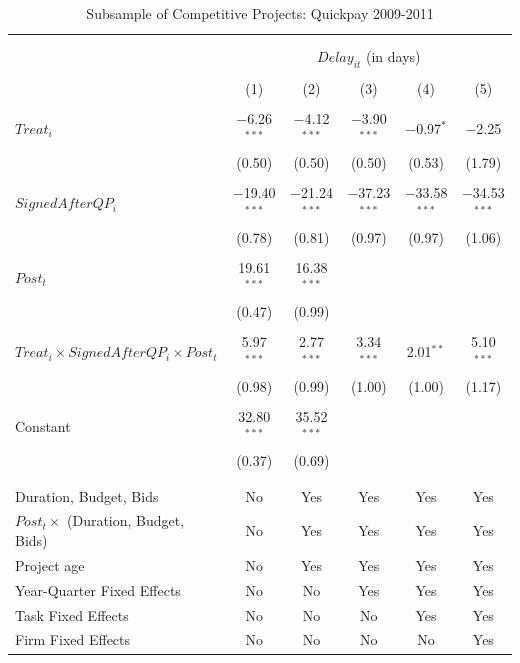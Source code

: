 \documentclass[
]{article}
\begin{document}
\begin{table}[H] \centering 
  \caption{Subsample of Competitive Projects: Quickpay 2009-2011} 
  \label{} 
\small 
\begin{tabular}{@{\extracolsep{-2pt}}lccccc} 
\\[-1.8ex]\hline 
\hline \\[-1.8ex] 
\\[-1.8ex] & \multicolumn{5}{c}{$Delay_{it}$ (in days)} \\ 
\\[-1.8ex] & (1) & (2) & (3) & (4) & (5)\\ 
\hline \\[-1.8ex] 
 $Treat_i$ & $-$6.26$^{***}$ & $-$4.12$^{***}$ & $-$3.90$^{***}$ & $-$0.97$^{*}$ & $-$2.25 \\ 
  & (0.50) & (0.50) & (0.50) & (0.53) & (1.79) \\ 
  & & & & & \\ 
 $SignedAfterQP_i$ & $-$19.40$^{***}$ & $-$21.24$^{***}$ & $-$37.23$^{***}$ & $-$33.58$^{***}$ & $-$34.53$^{***}$ \\ 
  & (0.78) & (0.81) & (0.97) & (0.97) & (1.06) \\ 
  & & & & & \\ 
 $Post_t$ & 19.61$^{***}$ & 16.38$^{***}$ &  &  &  \\ 
  & (0.47) & (0.99) &  &  &  \\ 
  & & & & & \\ 
 $Treat_i \times SignedAfterQP_i \times Post_t$ & 5.97$^{***}$ & 2.77$^{***}$ & 3.34$^{***}$ & 2.01$^{**}$ & 5.10$^{***}$ \\ 
  & (0.98) & (0.99) & (1.00) & (1.00) & (1.17) \\ 
  & & & & & \\ 
 Constant & 32.80$^{***}$ & 35.52$^{***}$ &  &  &  \\ 
  & (0.37) & (0.69) &  &  &  \\ 
  & & & & & \\ 
\hline \\[-1.8ex] 
Duration, Budget, Bids & No & Yes & Yes & Yes & Yes \\ 
$Post_t \times $  (Duration, Budget, Bids) & No & Yes & Yes & Yes & Yes \\ 
Project age & No & Yes & Yes & Yes & Yes \\ 
Year-Quarter Fixed Effects & No & No & Yes & Yes & Yes \\ 
Task Fixed Effects & No & No & No & Yes & Yes \\ 
Firm Fixed Effects & No & No & No & No & Yes \\ 

\end{tabular}
\end{table}
\end{document}
